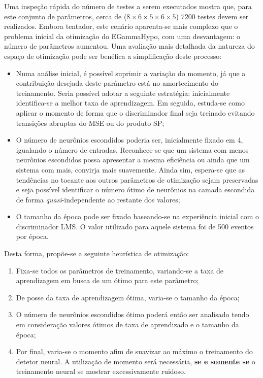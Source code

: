 Uma inspeção rápida do número de testes a serem executados mostra que, para
este conjunto de parâmetros, cerca de ($8\times6\times5\times6\times5$) 
$7200$ testes devem ser realizados. Embora tentador, este cenário aparenta-se
mais complexo que o problema inicial da otimização do EGammaHypo, com uma
desvantagem: o número de parâmetros aumentou. Uma avaliação mais detalhada da
natureza do espaço de otimização pode ser benéfica a simplificação deste
processo: 

\begin{itemize}
\item Numa análise inicial, é possível suprimir a variação do momento, já que
a contribuição desejada deste parâmetro está no amortecimento do
treinamento. Seria possível adotar a seguinte estratégia: inicialmente
identifica-se a melhor taxa de aprendizagem. Em seguida, estuda-se como
aplicar o momento de forma que o discriminador final seja treinado evitando
transições abruptas do MSE ou do produto SP;

\item O número de neurônios escondidos poderia ser, inicialmente fixado em 4,
igualando o número de entradas. Reconhece-se que um sistema com menos
neurônios escondidos possa apresentar a mesma eficiência ou ainda que um
sistema com mais, convirja mais suavemente. Ainda sim, espera-se que as
tendências no tocante aos outros parâmetros de otimização sejam preservadas e
seja possível identificar o número ótimo de neurônios na camada escondida de
forma \textit{quasi}-independente ao restante dos valores;

\item O tamanho da época pode ser fixado baseando-se na experiência inicial
com o discriminador LMS. O valor utilizado para aquele sistema foi de 500
eventos por época.
\end{itemize}

Desta forma, propõe-se a seguinte heurística de otimização:

\begin{enumerate}
\item Fixa-se todos os parâmetros de treinamento, variando-se a taxa de
aprendizagem em busca de um ótimo para este parâmetro;
\item De posse da taxa de aprendizagem ótima, varia-se o tamanho da época;
\item O número de neurônios escondidos ótimo poderá então ser analisado tendo
em consideração valores ótimos de taxa de aprendizado e o tamanho da época;
\item Por final, varia-se o momento afim de suavizar ao máximo o treinamento
do detetor neural. A utilização de momento será necessária, \textbf{se e
somente se} o treinamento neural se mostrar excessivamente ruidoso.
\end{enumerate}

